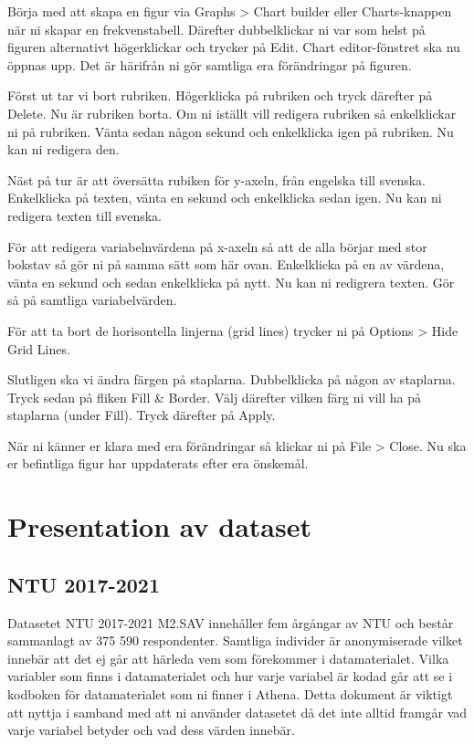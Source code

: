 \documentclass[
]{book}
\begin{document}
Börja med att skapa en figur via Graphs \textgreater{} Chart builder eller Charts-knappen när ni skapar en frekvenstabell. Därefter dubbelklickar ni var som helst på figuren alternativt högerklickar och trycker på Edit. Chart editor-fönstret ska nu öppnas upp. Det är härifrån ni gör samtliga era förändringar på figuren.

Först ut tar vi bort rubriken. Högerklicka på rubriken och tryck därefter på Delete. Nu är rubriken borta. Om ni iställt vill redigera rubriken så enkelklickar ni på rubriken. Vänta sedan någon sekund och enkelklicka igen på rubriken. Nu kan ni redigera den.

Näst på tur är att översätta rubiken för y-axeln, från engelska till svenska. Enkelklicka på texten, vänta en sekund och enkelklicka sedan igen. Nu kan ni redigera texten till svenska.

För att redigera variabelnvärdena på x-axeln så att de alla börjar med stor bokstav så gör ni på samma sätt som här ovan. Enkelklicka på en av värdena, vänta en sekund och sedan enkelklicka på nytt. Nu kan ni redigrera texten. Gör så på samtliga variabelvärden.

För att ta bort de horisontella linjerna (grid lines) trycker ni på Options \textgreater{} Hide Grid Lines.

Slutligen ska vi ändra färgen på staplarna. Dubbelklicka på någon av staplarna. Tryck sedan på fliken Fill \& Border. Välj därefter vilken färg ni vill ha på staplarna (under Fill). Tryck därefter på Apply.

När ni känner er klara med era förändringar så klickar ni på File \textgreater{} Close. Nu ska er befintliga figur har uppdaterats efter era önskemål.

\hypertarget{presentation-av-dataset}{%
\chapter{Presentation av dataset}\label{presentation-av-dataset}}

\hypertarget{ntu-2017-2021}{%
\section{NTU 2017-2021}\label{ntu-2017-2021}}

Datasetet NTU 2017-2021 M2.SAV innehåller fem årgångar av NTU och består sammanlagt av 375 590 respondenter. Samtliga individer är anonymiserade vilket innebär att det ej går att härleda vem som förekommer i datamaterialet. Vilka variabler som finns i datamaterialet och hur varje variabel är kodad går att se i kodboken för datamaterialet som ni finner i Athena. Detta dokument är viktigt att nyttja i samband med att ni använder datasetet då det inte alltid framgår vad varje variabel betyder och vad dess värden innebär.
\end{document}
